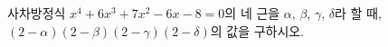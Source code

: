 사차방정식 $x^4+6x^3+7x^2-6x-8=0$의 네 근을 $\alpha$, $\beta$, $\gamma$, $\delta$라 할 때, $(2-\alpha)(2-\beta)(2-\gamma)(2-\delta)$의 값을 구하시오.

